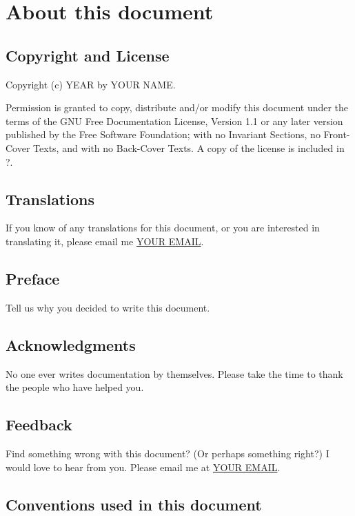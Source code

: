 \section{About this document}\label{about}

\subsection{Copyright and License}\label{copyright}

Copyright (c) YEAR by YOUR NAME.

Permission is granted to copy, distribute and/or modify this document
under the terms of the GNU Free Documentation License, Version 1.1 or
any later version published by the Free Software Foundation; with no
Invariant Sections, no Front-Cover Texts, and with no Back-Cover Texts.
A copy of the license is included in ?.

\subsection{Translations}\label{translations}

If you know of any translations for this document, or you are interested
in translating it, please email me \href{mailto:YOUR EMAIL}{YOUR EMAIL}.

\subsection{Preface}\label{preface}

Tell us why you decided to write this document.

\subsection{Acknowledgments}\label{thanks}

No one ever writes documentation by themselves. Please take the time to
thank the people who have helped you.

\subsection{Feedback}\label{feedback}

Find something wrong with this document? (Or perhaps something right?) I
would love to hear from you. Please email me at
\href{mailto:YOUR EMAIL}{YOUR EMAIL}.

\subsection{Conventions used in this document}\label{conventions}

